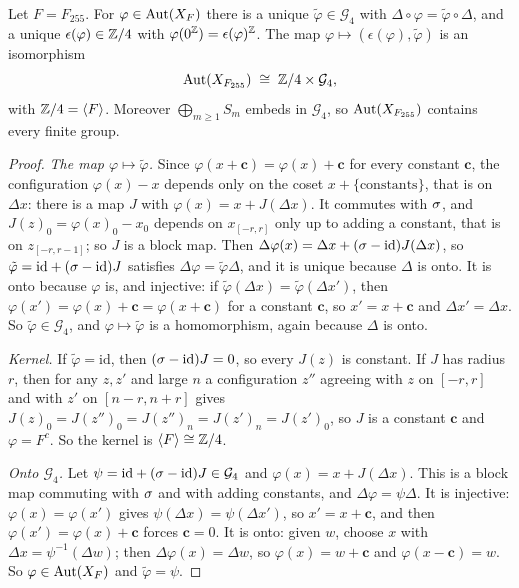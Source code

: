 \begin{proposition}\label{aff:prop:255}
Let $F=F_{255}$. For $\varphi\in\operatorname{Aut}(X_F)$ there is a unique $\tilde\varphi\in\mathcal G_4$ with $\Delta\circ\varphi=\tilde\varphi\circ\Delta$, and a unique $\epsilon(\varphi)\in\mathbb{Z}/4$ with $\varphi(0^{\mathbb{Z}})=\epsilon(\varphi)^{\mathbb{Z}}$. The map $\varphi\mapsto(\epsilon(\varphi),\tilde\varphi)$ is an isomorphism
\[
\operatorname{Aut}(X_{F_{255}})\;\cong\;\mathbb{Z}/4\times\mathcal G_4 ,
\]
with $\mathbb{Z}/4=\langle F\rangle$. Moreover $\bigoplus_{m\ge1}S_m$ embeds in $\mathcal G_4$, so $\operatorname{Aut}(X_{F_{255}})$ contains every finite group.
\end{proposition}

\begin{proof}
\emph{The map $\varphi\mapsto\tilde\varphi$.} Since $\varphi(x+\mathbf c)=\varphi(x)+\mathbf c$ for every constant $\mathbf c$, the configuration $\varphi(x)-x$ depends only on the coset $x+\{\text{constants}\}$, that is on $\Delta x$: there is a map $J$ with $\varphi(x)=x+J(\Delta x)$. It commutes with $\sigma$, and $J(z)_0=\varphi(x)_0-x_0$ depends on $x_{[-r,r]}$ only up to adding a constant, that is on $z_{[-r,r-1]}$; so $J$ is a block map. Then $\Delta\varphi(x)=\Delta x+(\sigma-\mathrm{id})J(\Delta x)$, so $\tilde\varphi=\mathrm{id}+(\sigma-\mathrm{id})J$ satisfies $\Delta\varphi=\tilde\varphi\Delta$, and it is unique because $\Delta$ is onto. It is onto because $\varphi$ is, and injective: if $\tilde\varphi(\Delta x)=\tilde\varphi(\Delta x')$, then $\varphi(x')=\varphi(x)+\mathbf c=\varphi(x+\mathbf c)$ for a constant $\mathbf c$, so $x'=x+\mathbf c$ and $\Delta x'=\Delta x$. So $\tilde\varphi\in\mathcal G_4$, and $\varphi\mapsto\tilde\varphi$ is a homomorphism, again because $\Delta$ is onto.

\emph{Kernel.} If $\tilde\varphi=\mathrm{id}$, then $(\sigma-\mathrm{id})J=0$, so every $J(z)$ is constant. If $J$ has radius $r$, then for any $z,z'$ and large $n$ a configuration $z''$ agreeing with $z$ on $[-r,r]$ and with $z'$ on $[n-r,n+r]$ gives $J(z)_0=J(z'')_0=J(z'')_n=J(z')_n=J(z')_0$, so $J$ is a constant $\mathbf c$ and $\varphi=F^{c}$. So the kernel is $\langle F\rangle\cong\mathbb{Z}/4$.

\emph{Onto $\mathcal G_4$.} Let $\psi=\mathrm{id}+(\sigma-\mathrm{id})J\in\mathcal G_4$ and $\varphi(x)=x+J(\Delta x)$. This is a block map commuting with $\sigma$ and with adding constants, and $\Delta\varphi=\psi\Delta$. It is injective: $\varphi(x)=\varphi(x')$ gives $\psi(\Delta x)=\psi(\Delta x')$, so $x'=x+\mathbf c$, and then $\varphi(x')=\varphi(x)+\mathbf c$ forces $\mathbf c=0$. It is onto: given $w$, choose $x$ with $\Delta x=\psi^{-1}(\Delta w)$; then $\Delta\varphi(x)=\Delta w$, so $\varphi(x)=w+\mathbf c$ and $\varphi(x-\mathbf c)=w$. So $\varphi\in\operatorname{Aut}(X_F)$ and $\tilde\varphi=\psi$.


\end{proof}

